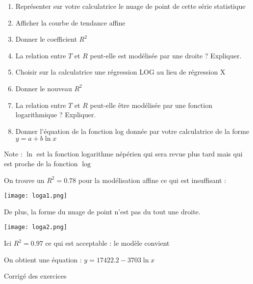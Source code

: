 \documentclass[12pt,a4paper,oneside,dvipsnames,table,svgnames,skins,theorems]{report}
\begin{document}
\begin{enumerate}
\item Représenter sur votre calculatrice le nuage de point de cette série statistique
\item Afficher la courbe de tendance affine
\item Donner le coefficient $R^2$
\item La relation entre $T$ et $R$ peut-elle est modélisée par une droite ? Expliquer.
\item Choisir sur la calculatrice une régression LOG au lieu de régression X 
\item Donner le nouveau $R^2$
\item La relation entre $T$ et $R$ peut-elle être modélisée par une fonction logarithmique ? Expliquer.
\item Donner l'équation de la fonction log donnée par votre calculatrice de la forme $y = a + b \ln x$
\end{enumerate}
Note : $\ln$ est la fonction logarithme népérien qui sera revue plus tard mais qui est proche de la fonction $\log$
\begin{correction}

On trouve un $R^2 = 0.78$ pour la modélisation affine ce qui est insuffisant :
\begin{center}
\texttt{[image: loga1.png]}
\end{center}
De plus, la forme du nuage de point n'est pas du tout une droite.
\begin{center}
\texttt{[image: loga2.png]}
\end{center}
Ici $R^2 = 0.97$ ce qui est acceptable : le modèle convient
\vspace{0.1cm}

On obtient une équation : $y=17422.2 - 3703 \ln x$

\end{correction}
\finexo

\fi
\ifsectioncorrige
\newpage
\begin{center}Corrigé des exercices\end{center}
\setcounter{page}{1}
\fi
\end{document}
